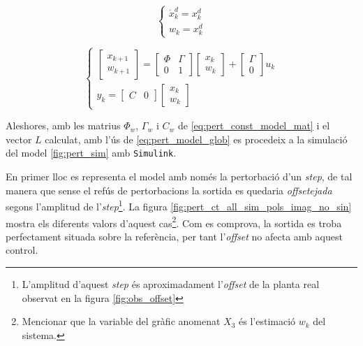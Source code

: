 \documentclass[12pt,a4paper,final,twoside,openright]{report}
\begin{document}
\begin{equation}\label{eq:pert_const}
\left\{
\begin{array}{lr}
\dot{x}^d_k = x^d_k\\
w_k = x^d_k
\end{array}
\right.
\end{equation}

\begin{equation}\label{eq:pert_const_model_mat}
\left\{
\begin{array}{lr}
\begin{bmatrix}
x_{k+1}\\
w_{k+1}
\end{bmatrix} = 
\begin{bmatrix}
\Phi & \Gamma \\
0 & 1
\end{bmatrix} \begin{bmatrix}
x_{k}\\
w_k
\end{bmatrix} + 
\begin{bmatrix}
\Gamma\\
0
\end{bmatrix} u_k\\
y_k=\begin{bmatrix}
C & 0
\end{bmatrix} \begin{bmatrix}
x_{k}\\
w_k
\end{bmatrix}
\end{array}
\right.
\end{equation}

Aleshores, amb les matrius $\Phi_w$, $\Gamma_w$ i $C_w$ de \eqref{eq:pert_const_model_mat} i el vector $L$ calculat, amb l'ús de \eqref{eq:pert_model_glob} es procedeix a la simulació del model \ref{fig:pert_sim} amb \texttt{Simulink}.

En primer lloc es representa el model amb només la pertorbació d'un \textit{step}, de tal manera que sense el refús de pertorbacions la sortida es quedaria \textit{offsetejada} segons l'amplitud de l'\textit{step}\footnote{L'amplitud d'aquest \textit{step} és aproximadament l'\textit{offset} de la planta real observat en la figura \ref{fig:obs_offset}}. La figura \ref{fig:pert_ct_all_sim_pols_imag_no_sin} mostra els diferents valors d'aquest cas\footnote{Mencionar que la variable del gràfic anomenat $X_3$ és l'estimació $w_k$ del sistema.}. Com es comprova, la sortida es troba perfectament situada sobre la referència, per tant l'\textit{offset} no afecta amb aquest control.
\end{document}
